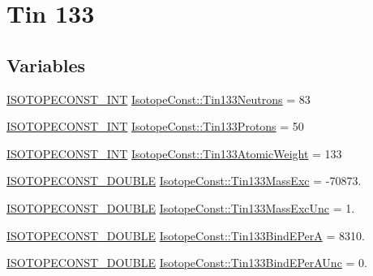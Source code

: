 \hypertarget{group___isotope_const-_tin-_sn133}{}\section{Tin 133}
\label{group___isotope_const-_tin-_sn133}
\subsection*{Variables}
\begin{DoxyCompactItemize}
\item 
\mbox{\hyperlink{group___isotope_const-_macros_ga5f18360b3e99483a35c32d789e62621c}{I\+S\+O\+T\+O\+P\+E\+C\+O\+N\+S\+T\+\_\+\+I\+NT}} \mbox{\hyperlink{group___isotope_const-_tin-_sn133_ga2b5ff7b353e15d0d59009944fee38d85}{Isotope\+Const\+::\+Tin133\+Neutrons}} = 83
\item 
\mbox{\hyperlink{group___isotope_const-_macros_ga5f18360b3e99483a35c32d789e62621c}{I\+S\+O\+T\+O\+P\+E\+C\+O\+N\+S\+T\+\_\+\+I\+NT}} \mbox{\hyperlink{group___isotope_const-_tin-_sn133_ga76463822a324c4acb850170efb728c85}{Isotope\+Const\+::\+Tin133\+Protons}} = 50
\item 
\mbox{\hyperlink{group___isotope_const-_macros_ga5f18360b3e99483a35c32d789e62621c}{I\+S\+O\+T\+O\+P\+E\+C\+O\+N\+S\+T\+\_\+\+I\+NT}} \mbox{\hyperlink{group___isotope_const-_tin-_sn133_ga26200d8927d62e36a33ebb3d18759a13}{Isotope\+Const\+::\+Tin133\+Atomic\+Weight}} = 133
\item 
\mbox{\hyperlink{group___isotope_const-_macros_ga8f45a7272ce02c0b4c65c44636ed719a}{I\+S\+O\+T\+O\+P\+E\+C\+O\+N\+S\+T\+\_\+\+D\+O\+U\+B\+LE}} \mbox{\hyperlink{group___isotope_const-_tin-_sn133_ga5b90bcb133ae6f0e67262c5a8ee25ad5}{Isotope\+Const\+::\+Tin133\+Mass\+Exc}} = -\/70873.
\item 
\mbox{\hyperlink{group___isotope_const-_macros_ga8f45a7272ce02c0b4c65c44636ed719a}{I\+S\+O\+T\+O\+P\+E\+C\+O\+N\+S\+T\+\_\+\+D\+O\+U\+B\+LE}} \mbox{\hyperlink{group___isotope_const-_tin-_sn133_gaade495a0921d98104a8b3d17b5a2c26a}{Isotope\+Const\+::\+Tin133\+Mass\+Exc\+Unc}} = 1.
\item 
\mbox{\hyperlink{group___isotope_const-_macros_ga8f45a7272ce02c0b4c65c44636ed719a}{I\+S\+O\+T\+O\+P\+E\+C\+O\+N\+S\+T\+\_\+\+D\+O\+U\+B\+LE}} \mbox{\hyperlink{group___isotope_const-_tin-_sn133_ga2ddbbd11bf4dd48500085d5de417b975}{Isotope\+Const\+::\+Tin133\+Bind\+E\+PerA}} = 8310.
\item 
\mbox{\hyperlink{group___isotope_const-_macros_ga8f45a7272ce02c0b4c65c44636ed719a}{I\+S\+O\+T\+O\+P\+E\+C\+O\+N\+S\+T\+\_\+\+D\+O\+U\+B\+LE}} \mbox{\hyperlink{group___isotope_const-_tin-_sn133_gab8c264066d9fa1fefca847a48c64cfc5}{Isotope\+Const\+::\+Tin133\+Bind\+E\+Per\+A\+Unc}} = 0.

\end{DoxyCompactItemize}
